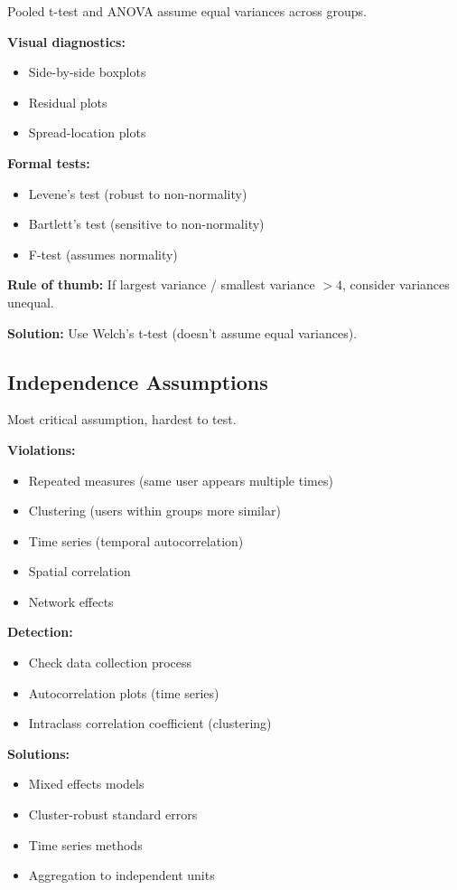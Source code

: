 Pooled t-test and ANOVA assume equal variances across groups.

\textbf{Visual diagnostics:}
\begin{itemize}
    \item Side-by-side boxplots
    \item Residual plots
    \item Spread-location plots
\end{itemize}

\textbf{Formal tests:}
\begin{itemize}
    \item Levene's test (robust to non-normality)
    \item Bartlett's test (sensitive to non-normality)
    \item F-test (assumes normality)
\end{itemize}

\textbf{Rule of thumb:} If largest variance / smallest variance $> 4$, consider variances unequal.

\textbf{Solution:} Use Welch's t-test (doesn't assume equal variances).

\subsection{Independence Assumptions}

Most critical assumption, hardest to test.

\textbf{Violations:}
\begin{itemize}
    \item Repeated measures (same user appears multiple times)
    \item Clustering (users within groups more similar)
    \item Time series (temporal autocorrelation)
    \item Spatial correlation
    \item Network effects
\end{itemize}

\textbf{Detection:}
\begin{itemize}
    \item Check data collection process
    \item Autocorrelation plots (time series)
    \item Intraclass correlation coefficient (clustering)
\end{itemize}

\textbf{Solutions:}
\begin{itemize}
    \item Mixed effects models
    \item Cluster-robust standard errors
    \item Time series methods
    \item Aggregation to independent units
\end{itemize}

